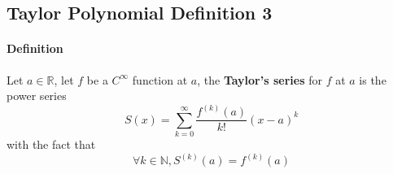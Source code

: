 \documentclass{article}
\newcommand{\R}[0]{\mathbb{R}}
\newcommand{\definition}[0]{\paragraph{Definition}}
\newcommand{\N}[0]{\mathbb{N}}
\newcommand{\series}[2]{\sum_{#1}^{\infty}{#2}}
\begin{document}
\subsection{Taylor Polynomial Definition 3}
\definition Let $a \in \R$, let $f$ be a $C^{\infty}$ function at $a$, the \textbf{Taylor's series} for $f$ at $a$ is the power series 
\[
	S(x) = \series{k=0}{\frac{f^{(k)}(a)}{k!}} (x-a)^k
\]
with the fact that 
\[
	\forall k \in \N, S^{(k)}(a) = f^{(k)}(a)
\]
\end{document}
